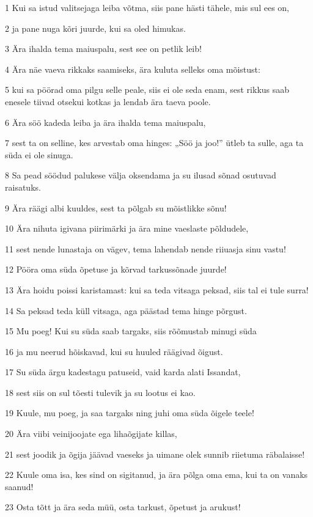 \par 1 Kui sa istud valitsejaga leiba võtma, siis pane hästi tähele, mis sul ees on,
\par 2 ja pane nuga kõri juurde, kui sa oled himukas.
\par 3 Ära ihalda tema maiuspalu, sest see on petlik leib!
\par 4 Ära näe vaeva rikkaks saamiseks, ära kuluta selleks oma mõistust:
\par 5 kui sa pöörad oma pilgu selle peale, siis ei ole seda enam, sest rikkus saab enesele tiivad otsekui kotkas ja lendab ära taeva poole.
\par 6 Ära söö kadeda leiba ja ära ihalda tema maiuspalu,
\par 7 sest ta on selline, kes arvestab oma hinges: „Söö ja joo!” ütleb ta sulle, aga ta süda ei ole sinuga.
\par 8 Sa pead söödud palukese välja oksendama ja su ilusad sõnad osutuvad raisatuks.
\par 9 Ära räägi albi kuuldes, sest ta põlgab su mõistlikke sõnu!
\par 10 Ära nihuta igivana piirimärki ja ära mine vaeslaste põldudele,
\par 11 sest nende lunastaja on vägev, tema lahendab nende riiuasja sinu vastu!
\par 12 Pööra oma süda õpetuse ja kõrvad tarkussõnade juurde!
\par 13 Ära hoidu poissi karistamast: kui sa teda vitsaga peksad, siis tal ei tule surra!
\par 14 Sa peksad teda küll vitsaga, aga päästad tema hinge põrgust.
\par 15 Mu poeg! Kui su süda saab targaks, siis rõõmustab minugi süda
\par 16 ja mu neerud hõiskavad, kui su huuled räägivad õigust.
\par 17 Su süda ärgu kadestagu patuseid, vaid karda alati Issandat,
\par 18 sest siis on sul tõesti tulevik ja su lootus ei kao.
\par 19 Kuule, mu poeg, ja saa targaks ning juhi oma süda õigele teele!
\par 20 Ära viibi veinijoojate ega lihaõgijate killas,
\par 21 sest joodik ja õgija jäävad vaeseks ja uimane olek sunnib riietuma räbalaisse!
\par 22 Kuule oma isa, kes sind on sigitanud, ja ära põlga oma ema, kui ta on vanaks saanud!
\par 23 Osta tõtt ja ära seda müü, osta tarkust, õpetust ja arukust!

